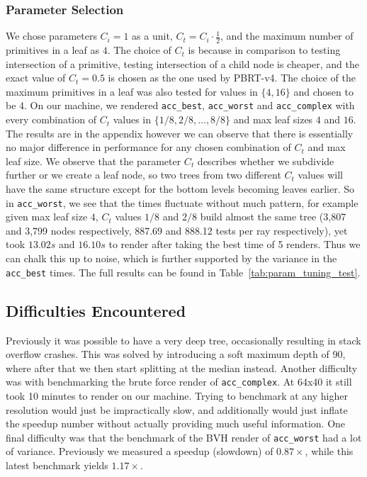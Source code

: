 \documentclass{article}
\begin{document}
\subsubsection{Parameter Selection}
We chose parameters $C_i = 1$ as a unit, $C_t = C_i \cdot \frac{1}{2}$, and the maximum number of primitives in a leaf as $4$. The choice of $C_t$ is because in comparison to testing intersection of a primitive, testing intersection of a child node is cheaper, and the exact value of $C_t = 0.5$ is chosen as the one used by PBRT-v4. The choice of the maximum primitives in a leaf was also tested for values in $\{4, 16\}$ and chosen to be 4. On our machine, we rendered \verb|acc_best|, \verb|acc_worst| and \verb|acc_complex| with every combination of $C_t$ values in $\{1/8, 2/8, \dots, 8/8\}$ and max leaf sizes $4$ and $16$. The results are in the appendix however we can observe that there is essentially no major difference in performance for any chosen combination of $C_t$ and max leaf size.
We observe that the parameter $C_t$ describes whether we subdivide further or we create a leaf node, so two trees from two different $C_t$ values will have the same structure except for the bottom levels becoming leaves earlier. So in \verb|acc_worst|, we see that the times fluctuate without much pattern, for example given max leaf size $4$, $C_t$ values $1/8$ and $2/8$ build almost the same tree (3,807 and 3,799 nodes respectively, 887.69 and 888.12 tests per ray respectively), yet took $13.02s$ and $16.10s$ to render after taking the best time of 5 renders. Thus we can chalk this up to noise, which is further supported by the variance in the \verb|acc_best| times. The full results can be found in Table~\ref{tab:param_tuning_test}.

\subsection{Difficulties Encountered}
Previously it was possible to have a very deep tree, occasionally resulting in stack overflow crashes. This was solved by introducing a soft maximum depth of 90, where after that we then start splitting at the median instead.
Another difficulty was with benchmarking the brute force render of \verb|acc_complex|. At 64x40 it still took 10 minutes to render on our machine. Trying to benchmark at any higher resolution would just be impractically slow, and additionally would just inflate the speedup number without actually providing much useful information.
One final difficulty was that the benchmark of the BVH render of \verb|acc_worst| had a lot of variance. Previously we measured a speedup (slowdown) of $0.87\times$, while this latest benchmark yields $1.17\times$.
\end{document}
